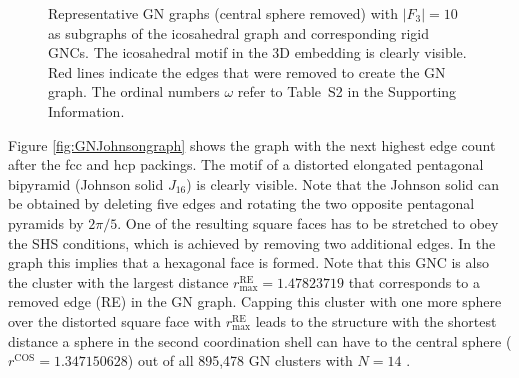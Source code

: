 \begin{figure}[htb]
    \caption{Representative GN graphs (central sphere removed) with $|F_3|=10$
    as subgraphs of the icosahedral graph and corresponding rigid GNCs. The
    icosahedral motif in the 3D embedding is clearly visible.  Red lines
    indicate the edges that were removed to create the GN graph. The ordinal
    numbers $\omega$ refer to Table~S2 in the Supporting Information.}
    \label{fig:GNicographs}
\end{figure}

Figure \ref{fig:GNJohnsongraph} shows the graph with the next highest edge
count after the fcc and hcp packings. The motif of a distorted elongated
pentagonal bipyramid (Johnson solid $J_{16}$) is clearly visible. Note that the
Johnson solid can be obtained by deleting five edges and rotating the two
opposite pentagonal pyramids by $2\pi /5$. One of the resulting square faces
has to be stretched to obey the SHS conditions, which is achieved by removing
two additional edges. In the graph this implies that a hexagonal face is
formed. Note that this GNC is also the cluster with the largest distance
$r_\mathrm{max}^\mathrm{RE}= 1.47823719$ that corresponds to a removed edge
(RE) in the GN graph. Capping this cluster with one more sphere over the
distorted square face with $r_\mathrm{max}^\mathrm{RE}$ leads to the structure
with the shortest distance a sphere in the second coordination shell can have
to the central sphere ($r^\mathrm{COS}=1.347150628$) out of all 895,478 GN
clusters with $N=14$ \autocite{Trombach_stickyhardsphereLennardJonestypeclusters_2018}.

